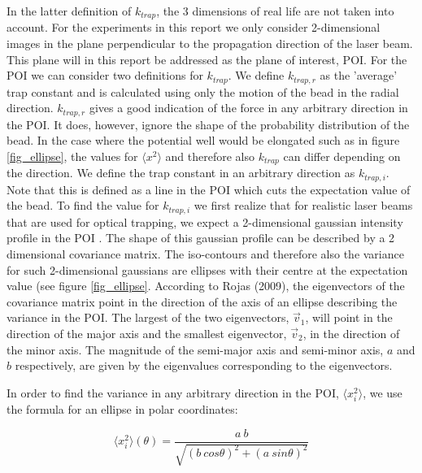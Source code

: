 In the latter definition of $k_{trap}$, the 3 dimensions of real life are not taken into account. For the experiments in this report we only consider 2-dimensional images in the plane perpendicular to the propagation direction of the laser beam. This plane will in this report be addressed as the plane of interest, POI. For the POI we can consider two definitions for $k_{trap}$. We define $k_{trap,r}$ as the 'average' trap constant and is calculated using only the motion of the bead in the radial direction. $k_{trap,r}$ gives a good indication of the force in any arbitrary direction in the POI. It does, however, ignore the shape of the probability distribution of the bead. In the case where the potential well would be elongated such as in figure \ref{fig_ellipse}, the values for $ \langle x^2 \rangle $ and therefore also $k_{trap}$ can differ depending on the direction. We define the trap constant in an arbitrary direction as $k_{trap,i}$. Note that this is defined as a line in the POI which cuts the expectation value of the bead. To find the value for $k_{trap,i}$ we first realize that for realistic laser beams that are used for optical trapping, we expect a 2-dimensional gaussian intensity profile in the POI \cite{shaevitz}. The shape of this gaussian profile can be described by a 2 dimensional covariance matrix. The iso-contours and therefore also the variance for such 2-dimensional gaussians are ellipses with their centre at the expectation value \cite{chuong} (see figure \ref{fig_ellipse}. According to Rojas (2009), the eigenvectors of the covariance matrix point in the direction of the axis of an ellipse describing the variance in the POI. The largest of the two eigenvectors, $\vec{v}_1$, will point in the direction of the major axis and the smallest eigenvector, $\vec{v}_2$, in the direction of the minor axis. The magnitude of the semi-major axis and semi-minor axis, $a$ and $b$ respectively, are given by the eigenvalues corresponding to the eigenvectors.\cite{rojas} 

In order to find the variance in any arbitrary direction in the POI,  $ \langle x_i^2 \rangle$, we use the formula for an ellipse in polar coordinates:
\label{alternate_method}

\begin{equation}
	 \langle x_i^2 \rangle ( \theta ) = \frac{a \: b}{\sqrt{( b \: cos\theta)^2 + (a \: sin\theta )^2}}
\end{equation}

